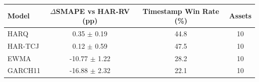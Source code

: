 \begin{tabular}{@{}lccc@{}}
\toprule
Model & $\Delta$SMAPE vs HAR-RV (pp) & Timestamp Win Rate (\%) & Assets \\
\midrule
HARQ & 0.35 $\pm$ 0.19 & 44.8 & 10 \\
HAR-TCJ & 0.12 $\pm$ 0.59 & 47.5 & 10 \\
EWMA & -10.77 $\pm$ 1.22 & 28.2 & 10 \\
GARCH11 & -16.88 $\pm$ 2.32 & 22.1 & 10 \\
\bottomrule
\end{tabular}
